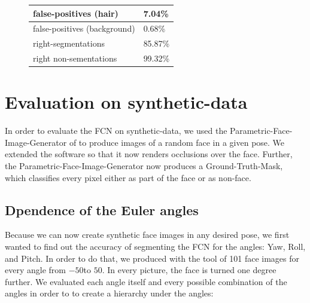 \begin{figure}
\begin{center}
\begin{tabular}{l|l} \hline
	false-positives (hair) & 7.04\%\\ \hline
	false-positives (background) & 0.68\%\\ \hline
	right-segmentations & 85.87\%\\ \hline
	right non-sementations & 99.32\% \\ \hline
\end{tabular}
\end{center}
\caption{\todo} 
\label{fig:Parts-LFW}
\end{figure}

\section{Evaluation on synthetic-data}
In order to evaluate the FCN on synthetic-data, we used the Parametric-Face-Image-Generator of \cite{parametric} to produce images of a random face in a given pose. We extended the software so that it now renders occlusions over the face. Further, the Parametric-Face-Image-Generator now produces a Ground-Truth-Mask, which classifies every pixel either as part of the face or as non-face.

\subsection{Dpendence of the Euler angles}
Because we can now create synthetic face images in any desired pose, we first wanted to find out the accuracy of segmenting the FCN for the angles: Yaw, Roll, and Pitch. In order to do that, we produced with the tool of \cite{parametric} 101 face images for every angle from $-50$\textdegree to $50$\textdegree. In every picture, the face is turned one degree further. We evaluated each angle itself and every possible combination of the angles in order to to create a hierarchy under the angles:

